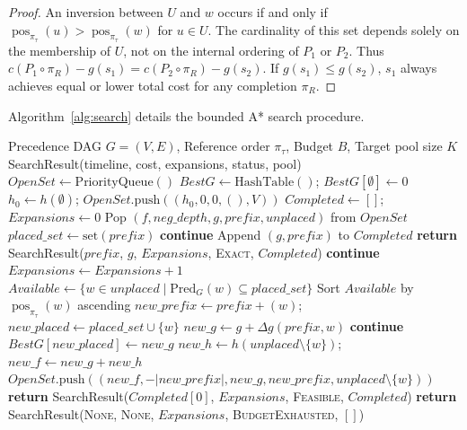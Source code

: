 \documentclass[journal]{IEEEtran}
\DeclareMathOperator{\pos}{pos}
\begin{document}
\begin{proof}
An inversion between $U$ and $w$ occurs if and only if $\pos_{\pi_\tau}(u) > \pos_{\pi_\tau}(w)$ for $u \in U$. The cardinality of this set depends solely on the membership of $U$, not on the internal ordering of $P_1$ or $P_2$. Thus $c(P_1 \circ \pi_R) - g(s_1) = c(P_2 \circ \pi_R) - g(s_2)$. If $g(s_1) \le g(s_2)$, $s_1$ always achieves equal or lower total cost for any completion $\pi_R$.
\end{proof}

Algorithm~\ref{alg:search} details the bounded A* search procedure.

\begin{algorithm}[t]
\caption{Bounded A* Search with Dominance Pruning}
\label{alg:search}
\begin{algorithmic}[1]
\Require Precedence DAG $G = (V, E)$, Reference order $\pi_\tau$, Budget $B$, Target pool size $K$
\Ensure SearchResult(timeline, cost, expansions, status, pool)
\State $OpenSet \gets \text{PriorityQueue}()$
\State $BestG \gets \text{HashTable}()$; $BestG[\emptyset] \gets 0$
\State $h_0 \gets h(\emptyset)$; $OpenSet.\text{push}((h_0, 0, 0, (), V))$
\State $Completed \gets []$; $Expansions \gets 0$
    \State Pop $(f, neg\_depth, g, prefix, unplaced)$ from $OpenSet$
    \State $placed\_set \gets \text{set}(prefix)$
        \State \textbf{continue} 
    \EndIf
        \State Append $(g, prefix)$ to $Completed$
            \State \textbf{return} SearchResult($prefix$, $g$, $Expansions$, \textsc{Exact}, $Completed$)
        \EndIf
        \State \textbf{continue}
    \EndIf
    \State $Expansions \gets Expansions + 1$
    \State $Available \gets \{w \in unplaced \mid \text{Pred}_G(w) \subseteq placed\_set\}$
    \State Sort $Available$ by $\pos_{\pi_\tau}(w)$ ascending
        \State $new\_prefix \gets prefix + (w)$; $new\_placed \gets placed\_set \cup \{w\}$
        \State $new\_g \gets g + \Delta g(prefix, w)$
                \State \textbf{continue}
            \EndIf
            \State $BestG[new\_placed] \gets new\_g$
        \EndIf
        \State $new\_h \gets h(unplaced \setminus \{w\})$; $new\_f \gets new\_g + new\_h$
        \State $OpenSet.\text{push}((new\_f, -|new\_prefix|, new\_g, new\_prefix, unplaced \setminus \{w\}))$
    \EndFor
\EndWhile
{}
    \State \textbf{return} SearchResult($Completed[0]$, $Expansions$, \textsc{Feasible}, $Completed$)
\Else
    \State \textbf{return} SearchResult(\textsc{None}, \textsc{None}, $Expansions$, \textsc{BudgetExhausted}, $[]$)
\EndIf
\end{algorithmic}
\end{algorithm}
\end{document}
